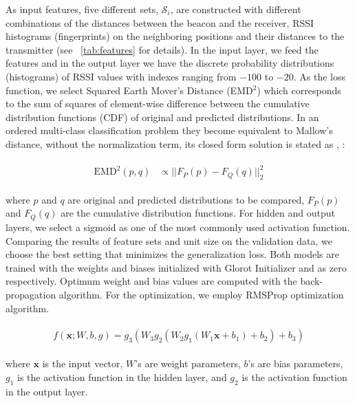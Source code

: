 \documentclass{article}
\newcommand{\x}{\mathbf{x}}
\begin{document}
	As input features, five different sets, $\mathcal{S}_i$, are constructed with different combinations of the distances between the beacon and the receiver, RSSI histograms (fingerprints) on the neighboring positions and their distances to the transmitter (see \tablename{~\ref{tab:features}} for details). In the input layer, we feed the features and in the output layer we have the discrete probability distributions (histograms) of RSSI values with indexes ranging from $-100$ to $-20$. 
	As the loss function, we select Squared Earth Mover's Distance (EMD$^2$)\cite{Rub2000} which corresponds to the sum of squares of element-wise difference between the cumulative distribution functions (CDF) of original and predicted distributions. In an ordered multi-class classification problem they become equivalent to Mallow's distance, without the normalization term, its closed form solution is stated as \cite{conf/iccv/LevinaB01}, \cite{Hou2016}:
	\begin{small}
		\begin{align}
		\begin{split}
		\text{EMD}^2(p, q) &\propto || F_P(p) - F_Q(q)||^2_2 \end{split}
		\end{align}
	\end{small}
	where $p$ and $q$ are original and predicted distributions to be compared, $F_P(p)$ and $F_Q(q)$ are the cumulative distribution functions. For hidden and output layers, we select a sigmoid as one of the most commonly used activation function. Comparing the results of feature sets and unit size on the validation data, we choose the best setting that minimizes the generalization loss. Both models are trained with the weights and biases initialized with Glorot Initializer \cite{Glo2010} and as zero respectively. Optimum weight and bias values are computed with the back-propagation algorithm. For the optimization, we employ RMSProp optimization algorithm. \cite{Good2016}
	\begin{small}
		\begin{align}
		\begin{split}
		f(\x; W, b, g) = g_3(W_3 g_2(W_2 g_1(W_1 \x + b_1) + b_2) + b_3)
		\end{split}
		\label{eq:model}
		\end{align}
	\end{small}
	where $\x$ is the input vector, $W$'s are weight parameters, $b$'s are bias parameters, $g_1$ is the activation function in the hidden layer, and $g_2$ is the activation function in the output layer.
\end{document}
